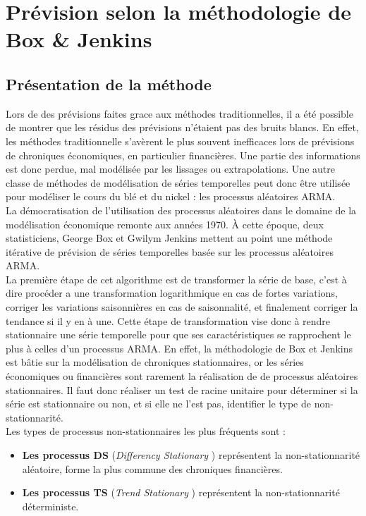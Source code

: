 \section{Prévision selon la méthodologie de Box \& Jenkins}\label{sec:bj}
\subsection{Présentation de la méthode}
Lors de des prévisions faites grace aux méthodes traditionnelles, il a été possible de montrer que les résidus des prévisions n'étaient pas des bruits blancs. En effet, 
les méthodes traditionnelle s'avèrent le plus souvent inefficaces lors de prévisions de chroniques économiques, en particulier financières. Une partie des informations est 
donc perdue, mal modélisée par les lissages ou extrapolations. Une autre classe de méthodes de modélisation de séries temporelles peut donc être utilisée pour modéliser le 
cours du blé et du nickel : les processus aléatoires ARMA.\\[11pt]
La démocratisation de l'utilisation des processus aléatoires dans le domaine de la modélisation économique remonte aux années 1970. À cette époque, deux statisticiens, 
George Box et Gwilym Jenkins mettent au point une méthode itérative de prévision de séries temporelles basée sur les processus aléatoires ARMA. \\[11pt]
La première étape de cet algorithme est de transformer la série de base, c'est à dire procéder a une transformation logarithmique en cas de fortes variations, corriger les 
variations saisonnières en cas de saisonnalité, et finalement corriger la tendance si il y en à une. Cette étape de transformation vise donc à rendre stationnaire une 
série temporelle pour que ses caractéristiques se rapprochent le plus à celles d'un processus ARMA. En effet, la méthodologie de Box et Jenkins est bâtie sur la 
modélisation de chroniques stationnaires, or les séries économiques ou financières sont rarement la réalisation de de processus aléatoires stationnaires. Il faut donc 
réaliser un test de racine unitaire pour déterminer si la série est stationnaire ou non, et si elle ne l'est pas, identifier le type de non-stationnarité.\\[11pt]
Les types de processus non-stationnaires les plus fréquents sont :
\begin{itemize}
    \item \textbf{Les processus DS}  (\textit{Differency Stationary} ) représentent la non-stationnarité aléatoire, forme la plus commune des chroniques financières.
    \item \textbf{Les processus TS}  (\textit{Trend Stationary} ) représentent la non-stationnarité déterministe.
\end{itemize}
